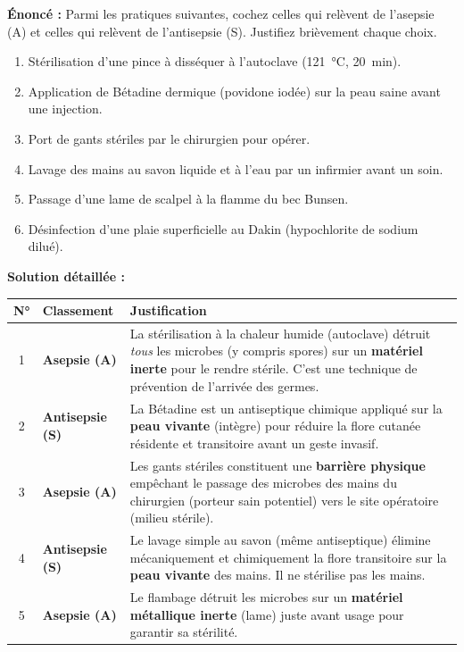 \documentclass[11pt]{article}
\begin{document}
\begin{exoresolu}
    \textbf{Énoncé :} Parmi les pratiques suivantes, cochez celles qui relèvent de l'asepsie (A) et celles qui relèvent de l'antisepsie (S). Justifiez brièvement chaque choix.
    \begin{enumerate}
        \item Stérilisation d'une pince à disséquer à l'autoclave (\SI{121}{\celsius}, \SI{20}{min}).
        \item Application de Bétadine dermique (povidone iodée) sur la peau saine avant une injection.
        \item Port de gants stériles par le chirurgien pour opérer.
        \item Lavage des mains au savon liquide et à l'eau par un infirmier avant un soin.
        \item Passage d'une lame de scalpel à la flamme du bec Bunsen.
        \item Désinfection d'une plaie superficielle au Dakin (hypochlorite de sodium dilué).
    \end{enumerate}
    \tcblower
    \textbf{Solution détaillée :}
    \begin{center}
    \begin{tabularx}{\linewidth}{|c|X|X|}\hline
    \rowcolor{popblueL} \textbf{N°} & \textbf{Classement} & \textbf{Justification} \\ \hline
    1 & \textbf{Asepsie (A)} & La stérilisation à la chaleur humide (autoclave) détruit \emph{tous} les microbes (y compris spores) sur un \textbf{matériel inerte} pour le rendre stérile. C'est une technique de prévention de l'arrivée des germes. \\ \hline
    2 & \textbf{Antisepsie (S)} & La Bétadine est un antiseptique chimique appliqué sur la \textbf{peau vivante} (intègre) pour réduire la flore cutanée résidente et transitoire avant un geste invasif. \\ \hline
    3 & \textbf{Asepsie (A)} & Les gants stériles constituent une \textbf{barrière physique} empêchant le passage des microbes des mains du chirurgien (porteur sain potentiel) vers le site opératoire (milieu stérile). \\ \hline
    4 & \textbf{Antisepsie (S)} & Le lavage simple au savon (même antiseptique) élimine mécaniquement et chimiquement la flore transitoire sur la \textbf{peau vivante} des mains. Il ne stérilise pas les mains. \\ \hline
    5 & \textbf{Asepsie (A)} & Le flambage détruit les microbes sur un \textbf{matériel métallique inerte} (lame) juste avant usage pour garantir sa stérilité. \\ \hline

\end{tabularx}
\end{center}
\end{exoresolu}
\end{document}
